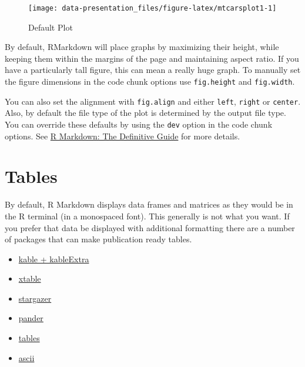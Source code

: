 \documentclass[]{book}
\providecommand{\tightlist}{%
  \setlength{\itemsep}{0pt}\setlength{\parskip}{0pt}}
\begin{document}
\begin{figure}

{\centering \texttt{[image: data-presentation\_files/figure-latex/mtcarsplot1-1]} 

}

\caption{Default Plot}\label{fig:mtcarsplot1}
\end{figure}

By default, RMarkdown will place graphs by maximizing their height,
while keeping them within the margins of the page and maintaining aspect
ratio. If you have a particularly tall figure, this can mean a really
huge graph. To manually set the figure dimensions in the code chunk
options use \texttt{fig.height} and \texttt{fig.width}.

You can also set the alignment with \texttt{fig.align} and either
\texttt{left}, \texttt{right} or \texttt{center}. Also, by default the
file type of the plot is determined by the output file type. You can
override these defaults by using the \texttt{dev} option in the code
chunk options. See \href{https://bookdown.org/yihui/rmarkdown/}{R
Markdown: The Definitive Guide} for more details.

\section{Tables}\label{tables}

By default, R Markdown displays data frames and matrices as they would
be in the R terminal (in a monospaced font). This generally is not what
you want. If you prefer that data be displayed with additional
formatting there are a number of packages that can make publication
ready tables.

\begin{itemize}
\tightlist
\item
  \href{https://cran.r-project.org/web/packages/kableExtra/index.html}{kable
  + kableExtra}
\item
  \href{https://cran.r-project.org/web/packages/xtable/index.html}{xtable}
\item
  \href{https://cran.r-project.org/web/packages/stargazer/index.html}{stargazer}
\item
  \href{https://cran.r-project.org/web/packages/pander/index.html}{pander}
\item
  \href{https://cran.r-project.org/web/packages/tables/index.html}{tables}
\item
  \href{https://cran.r-project.org/web/packages/ascii/index.html}{ascii}
\end{itemize}
\end{document}
